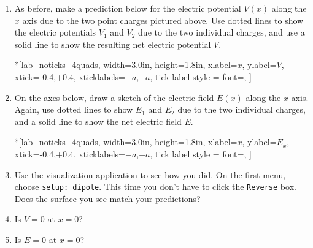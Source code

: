 \begin{enumerate}[labparts]

\item As before, make a prediction below for the electric potential $V(x)$ along the $x$ axis due to the two point charges pictured above.  Use dotted lines to show the electric potentials $V_1$ and $V_2$ due to the two individual charges, and use a solid line to show the resulting net electric potential $V$.  

\begin{lab_axis}*[lab_noticks_4quads,
	width={3.0in}, height={1.8in},
	xlabel=$x$,
	ylabel=$V$,
	xtick={-0.4,+0.4},
	xticklabels={$-a$,$+a$},
	tick label style = {font=\itshape},
	]
\end{lab_axis}

\item On the axes below, draw a sketch of the electric field $E(x)$ along the $x$ axis.  Again, use dotted lines to show $E_1$ and $E_2$ due to the two individual charges, and a solid line to show the net electric field $E$.

\begin{lab_axis}*[lab_noticks_4quads,
	width={3.0in}, height={1.8in},
	xlabel=$x$,
	ylabel=$E_x$,
	xtick={-0.4,+0.4},
	xticklabels={$-a$,$+a$},
	tick label style = {font=\itshape},
	]
\end{lab_axis}

\item Use the visualization application to see how you did.  On the first menu, choose \verb!setup: dipole!.  This time you don't have to click the \verb!Reverse! box.  Does the surface you see match your predictions?
\answerspace{0.3in}

\item Is $V=0$ at $x=0$?
\answerspace{0.3in}

\item Is $E=0$ at $x=0$?
\answerspace{0.3in}


\end{enumerate}

